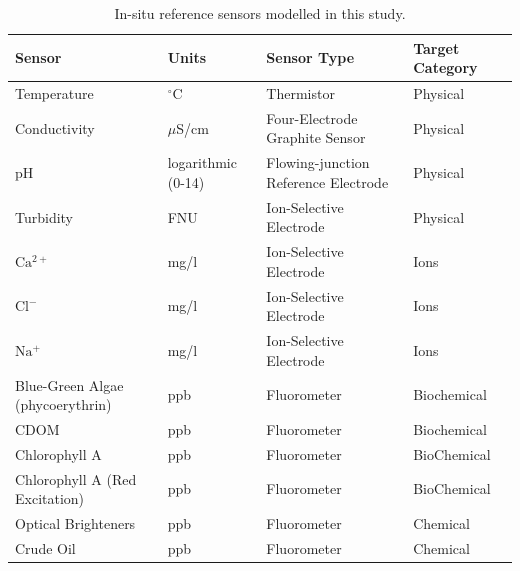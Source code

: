\documentclass[journal,article,submit,pdftex,moreauthors]{Definitions/mdpi}
\begin{document}
\begin{table}[H] 
\caption{In-situ reference sensors modelled in this study.\label{tab:sensors}}
\begin{tabularx}{\textwidth}{CCCC}
\toprule
\textbf{Sensor}	& \textbf{Units} & \textbf{Sensor Type} & \textbf{Target Category}\\
\midrule
Temperature		                    & $^{\circ}$C       & Thermistor  & Physical \\
Conductivity                        & $\mu$S/cm         & Four-Electrode Graphite Sensor & Physical  \\
pH                                  & logarithmic (0-14)& Flowing-junction Reference Electrode & Physical \\
Turbidity                           & FNU               & Ion-Selective Electrode  & Physical \\
$\mathrm{Ca^{2+}}$                  & mg/l              & Ion-Selective Electrode  & Ions \\
$\mathrm{Cl^-}$                     & mg/l              & Ion-Selective Electrode & Ions \\
$\mathrm{Na^+}$                     & mg/l              & Ion-Selective Electrode & Ions \\
Blue-Green Algae (phycoerythrin)    & ppb               & Fluorometer & Biochemical \\
CDOM                                & ppb               & Fluorometer & Biochemical \\
Chlorophyll A                       & ppb               & Fluorometer & BioChemical \\
Chlorophyll A (Red Excitation)      & ppb               & Fluorometer & BioChemical\\
Optical Brighteners                 & ppb               & Fluorometer & Chemical \\
Crude Oil                           & ppb               & Fluorometer & Chemical\\
\bottomrule
\end{tabularx}
\end{table}
\end{document}
